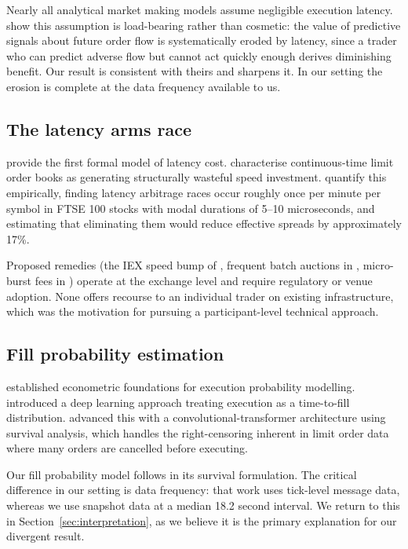 \documentclass[11pt]{article}
\begin{document}
Nearly all analytical market making models assume negligible execution latency.
\citet{lehalle2022} show this assumption is load-bearing rather than
cosmetic: the value of predictive signals about future order flow is
systematically eroded by latency, since a trader who can predict adverse flow
but cannot act quickly enough derives diminishing benefit. Our result is consistent with theirs and sharpens it. In our setting the
erosion is complete at the data frequency available to us.

\subsection{The latency arms race}

\citet{moallemi2013} provide the first formal model of latency cost.
\citet{budish2015} characterise continuous-time limit order books as generating
structurally wasteful speed investment. \citet{aquilina2022} quantify this
empirically, finding latency arbitrage races occur roughly once per minute per
symbol in FTSE 100 stocks with modal durations of 5--10 microseconds, and
estimating that eliminating them would reduce effective spreads by
approximately 17\%.

Proposed remedies (the IEX speed bump of \citealp{hu2019}, frequent batch
auctions in \citealp{budish2015}, micro-burst fees in \citealp{brolley2023})
operate at the exchange level and require regulatory or venue adoption. None offers
recourse to an individual trader on existing infrastructure, which was the
motivation for pursuing a participant-level technical approach.

\subsection{Fill probability estimation}

\citet{lo2002} established econometric foundations for execution probability
modelling. \citet{maglaras2022} introduced a deep learning approach treating
execution as a time-to-fill distribution. \citet{arroyo2024} advanced this with
a convolutional-transformer architecture using survival analysis, which handles
the right-censoring inherent in limit order data where many orders are cancelled
before executing.

Our fill probability model follows \citet{arroyo2024} in its survival
formulation. The critical difference in our setting is data frequency: that work
uses tick-level message data, whereas we use snapshot data at a median 18.2
second interval. We return to this in Section~\ref{sec:interpretation}, as we
believe it is the primary explanation for our divergent result.
\end{document}
